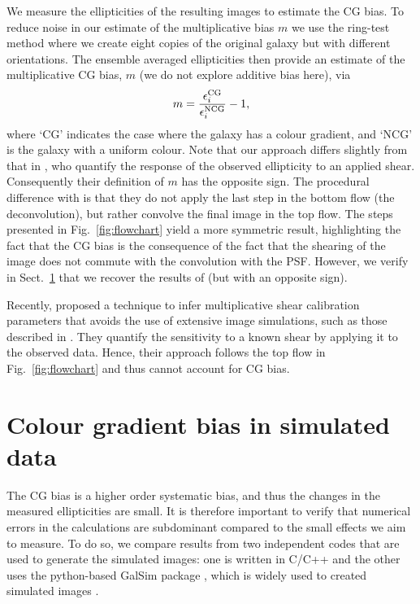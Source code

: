 \documentclass[useAMS,usenatbib]{mnras}
\newcommand{\be}{\begin{equation}}
\newcommand{\ee}{\end{equation}}
\begin{document}
We measure the ellipticities of the resulting images to estimate the CG bias. To reduce noise in our estimate of the multiplicative bias $m$ we use the ring-test method \citep{Nakajima07} where we create eight copies of the original galaxy but with different orientations. The ensemble averaged ellipticities then  provide an estimate of the multiplicative CG bias, $m$ (we do not explore additive bias here), via
%
\be
m= {\epsilon_i^{\rm CG} \over \epsilon_i^{\rm NCG} }-1,
\ee
%
where `CG' indicates the case where the galaxy has a colour gradient, and `NCG' is the galaxy
with a uniform colour. Note that our approach differs slightly from that in , who quantify the response of the observed ellipticity to an applied shear. Consequently their definition
of $m$ has the opposite sign. The procedural difference with  is that they do not apply the last step in the bottom flow (the deconvolution), but rather convolve the final image in the top flow.
The steps presented in Fig.~\ref{fig:flowchart} yield a more symmetric result, highlighting the fact
that the CG bias is the consequence of the fact that the shearing of the image does not commute
with the convolution with the PSF. However, we verify in Sect.~\ref{sec:simulations} that we recover
the results of  (but with an opposite sign).

Recently, \cite{Huff17} proposed a technique to infer multiplicative shear calibration parameters that avoids the use of extensive image simulations, such as those described in \citep{Hoekstra17}. They quantify the
sensitivity to a known shear by applying it to the observed data. Hence, their approach follows the top flow in Fig.~\ref{fig:flowchart} and thus cannot account for CG bias.

\section{Colour gradient bias in simulated data}
\label{sec:simulations}

The CG bias is a higher order systematic bias, and thus the changes in the measured ellipticities are small. It is therefore important to verify that numerical errors in the calculations are subdominant compared to the small effects we aim to measure. To do so, we compare results from two independent codes that are used to generate the simulated images: one is written in C/C++ and the other uses the
python-based {\sc GalSim} package \citep{Rowe15}, which is widely used to created simulated images \citep[e.g.][]{FenechConti17, Hoekstra17}.
\end{document}
